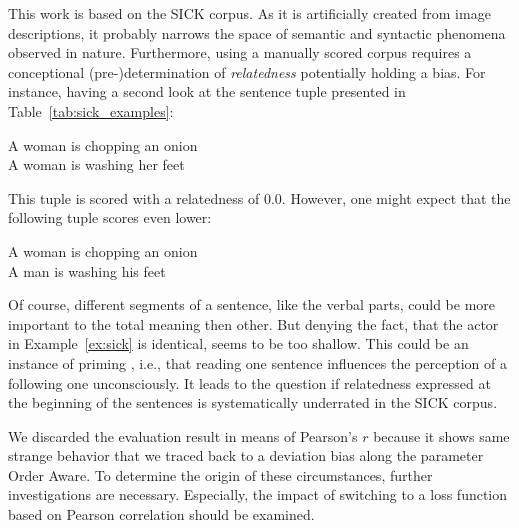 This work is based on the SICK corpus. As it is artificially created from image descriptions, it probably narrows the space of semantic and syntactic phenomena observed in nature. Furthermore, using a manually scored corpus requires a conceptional (pre-)determination of \textit{relatedness} potentially holding a bias. For instance, having a second look at the sentence tuple presented in Table~\ref{tab:sick_examples}:
\begin{exe}
	\ex \label{ex:sick} A woman is chopping an onion \\
		A woman is washing her feet
\end{exe}
This tuple is scored with a relatedness of $0.0$. However, one might expect that the following tuple scores even lower:
\begin{exe}
	\ex \label{ex:no_sick} A woman is chopping an onion \\
		A man is washing his feet
\end{exe}
Of course, different segments of a sentence, like the verbal parts, could be more important to the total meaning then other. But denying the fact, that the actor in Example~\ref{ex:sick} is identical,  seems to be too shallow. This could be an instance of priming \autocite{weingarten_primed_2016}, i.e., that reading one sentence influences the perception of a following one unconsciously. It leads to the question if relatedness expressed at the beginning of the sentences is systematically underrated in the SICK corpus.

We discarded the evaluation result in means of Pearson's $r$ because it shows same strange behavior that we traced back to a deviation bias along the parameter Order Aware. To determine the origin of these circumstances, further investigations are necessary. Especially, the impact of switching to a loss function based on Pearson correlation should be examined.


